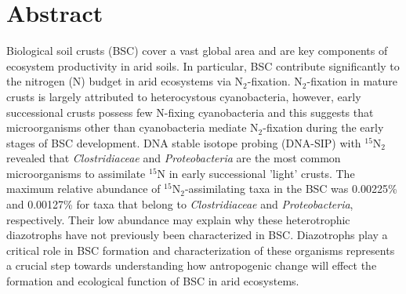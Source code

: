 \section{Abstract}
Biological soil crusts (BSC) cover a vast global area and are key
components of ecosystem productivity in arid soils. In particular, BSC
contribute significantly to the nitrogen (N) budget in arid ecosystems
via N$_{2}$-fixation.  N$_{2}$-fixation in mature crusts is largely
attributed to heterocystous cyanobacteria, however, early successional
crusts possess few N-fixing cyanobacteria and this
suggests that microorganisms other than cyanobacteria mediate
N$_{2}$-fixation during the early stages of BSC development. DNA stable
isotope probing (DNA-SIP) with $^{15}$N$_{2}$ revealed that
\textit{Clostridiaceae} and \textit{Proteobacteria} are the most common
microorganisms to assimilate $^{15}$N in early successional 'light'
crusts.  The maximum relative abundance of $^{15}$N$_{2}$-assimilating
taxa in the BSC was 0.00225\% and 0.00127\% for taxa that belong to
\textit{Clostridiaceae} and \textit{Proteobacteria}, respectively.
Their low abundance may explain why these heterotrophic diazotrophs
have not previously been characterized in BSC.  Diazotrophs play a
critical role in BSC formation and characterization of these organisms
represents a crucial step towards understanding how antropogenic change
will effect the formation and ecological function of BSC in arid
ecosystems.


